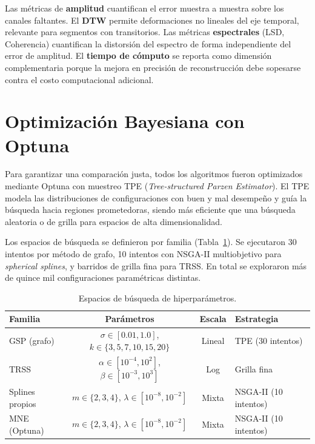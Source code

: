 Las métricas de \textbf{amplitud} cuantifican el error muestra a muestra sobre los canales faltantes. El \textbf{DTW} permite deformaciones no lineales del eje temporal, relevante para segmentos con transitorios. Las métricas \textbf{espectrales} (LSD, Coherencia) cuantifican la distorsión del espectro de forma independiente del error de amplitud. El \textbf{tiempo de cómputo} se reporta como dimensión complementaria porque la mejora en precisión de reconstrucción debe sopesarse contra el costo computacional adicional.

\section{Optimización Bayesiana con Optuna}
\label{sec:optuna}

Para garantizar una comparación justa, todos los algoritmos fueron optimizados mediante Optuna \cite{akiba2019optuna} con muestreo TPE (\textit{Tree-structured Parzen Estimator}). El TPE modela las distribuciones de configuraciones con buen y mal desempeño y guía la búsqueda hacia regiones prometedoras, siendo más eficiente que una búsqueda aleatoria o de grilla para espacios de alta dimensionalidad.

Los espacios de búsqueda se definieron por familia (Tabla~\ref{tab:hyperparams}). Se ejecutaron 30 intentos por método de grafo, 10 intentos con NSGA-II multiobjetivo para \textit{spherical splines}, y barridos de grilla fina para TRSS. En total se exploraron más de quince mil configuraciones paramétricas distintas.

\begin{table}[htbp]
\centering
\caption{Espacios de búsqueda de hiperparámetros.}
\label{tab:hyperparams}
\small
\begin{tabular}{@{}l c c l@{}}
\toprule
Familia & Parámetros & Escala & Estrategia \\
\midrule
GSP (grafo) & $\sigma \in [0.01, 1.0]$, $k \in \{3,5,7,10,15,20\}$ & Lineal & TPE (30 intentos) \\
TRSS & $\alpha \in [10^{-4}, 10^2]$, $\beta \in [10^{-3}, 10^3]$ & Log & Grilla fina \\
Splines propios & $m \in \{2,3,4\}$, $\lambda \in [10^{-8}, 10^{-2}]$ & Mixta & NSGA-II (10 intentos) \\
MNE (Optuna) & $m \in \{2,3,4\}$, $\lambda \in [10^{-8}, 10^{-2}]$ & Mixta & NSGA-II (10 intentos) \\
\bottomrule
\end{tabular}
\end{table}

